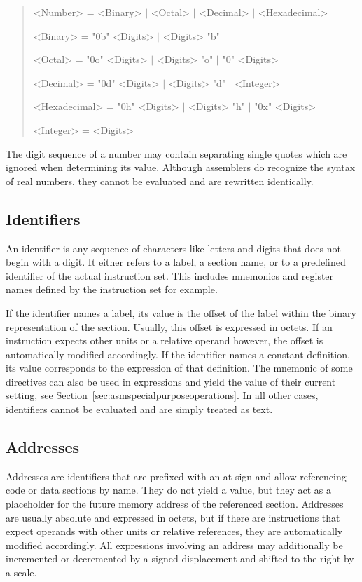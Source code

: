 \begin{quote}\begin{grammar}
<Number> = <Binary> $\mid$ <Octal> $\mid$ <Decimal> $\mid$ <Hexadecimal> \par
<Binary> = "0b" <Digits> $\mid$ <Digits> "b" \par
<Octal> = "0o" <Digits> $\mid$ <Digits> "o" $\mid$ "0" <Digits> \par
<Decimal> = "0d" <Digits> $\mid$ <Digits> "d" $\mid$ <Integer> \par
<Hexadecimal> = "0h" <Digits> $\mid$ <Digits> "h" $\mid$ "0x" <Digits> \par
<Integer> = <Digits> \par
\end{grammar}\end{quote}

The digit sequence of a number may contain separating single quotes which are ignored when determining its value.
Although assemblers do recognize the syntax of real numbers, they cannot be evaluated and are rewritten identically.

\subsection{Identifiers}

An identifier is any sequence of characters like letters and digits that does not begin with a digit.
It either refers to a label, a section name, or to a predefined identifier of the actual instruction set.
This includes mnemonics and register names defined by the instruction set for example.

If the identifier names a label, its value is the offset of the label within the binary representation of the section.
Usually, this offset is expressed in octets.
If an instruction expects other units or a relative operand however, the offset is automatically modified accordingly.
If the identifier names a constant definition, its value corresponds to the expression of that definition.
The mnemonic of some directives can also be used in expressions and yield the value of their current setting, see Section~\ref{sec:asmspecialpurposeoperations}.
In all other cases, identifiers cannot be evaluated and are simply treated as text.

\subsection{Addresses}

Addresses are identifiers that are prefixed with an at sign and allow referencing code or data sections by name.
They do not yield a value, but they act as a placeholder for the future memory address of the referenced section.
Addresses are usually absolute and expressed in octets, but if there are instructions that expect operands with other units or relative references, they are automatically modified accordingly.
All expressions involving an address may additionally be incremented or decremented by a signed displacement and shifted to the right by a scale.

